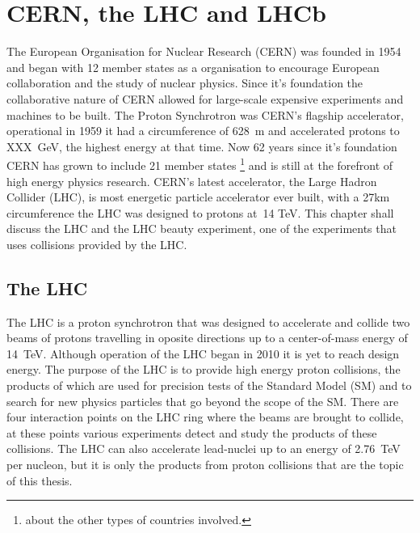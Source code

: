 \chapter{CERN, the LHC and LHCb}
\label{CERN_LHC_LHCb}

The European Organisation for Nuclear Research (CERN) was founded in 1954 and began with 12 member states as a organisation to encourage European collaboration and the study of nuclear physics. Since it's foundation the collaborative nature of CERN allowed for large-scale expensive experiments and machines to be built. The Proton Synchrotron was CERN's flagship accelerator, operational in 1959 it had a circumference of 628~m and accelerated protons to XXX~GeV, the highest energy at that time. Now 62 years since it's foundation CERN has grown to include 21 member states \footnote{about the other types of countries involved.} and is still at the forefront of high energy physics research. CERN’s latest accelerator, the Large Hadron Collider (LHC), is most energetic particle accelerator ever built, with a 27km circumference the LHC was designed to protons at~14 TeV. This chapter shall discuss the LHC and the LHC beauty experiment, one of the experiments that uses collisions provided by the LHC.

\section{The LHC}
\label{LHC}


The LHC is a proton synchrotron that was designed to accelerate and collide two beams of protons travelling in oposite directions up to a center-of-mass energy of 14~TeV. Although operation of the LHC began in 2010 it is yet to reach design energy. The purpose of the LHC is to provide high energy proton collisions, the products of which are used for precision tests of the Standard Model (SM) and to search for new physics particles that go beyond the scope of the SM. There are four interaction points on the LHC ring where the beams are brought to collide, at these points various experiments detect and study the products of these collisions. The LHC can also accelerate lead-nuclei up to an energy of 2.76~TeV per nucleon, but it is only the products from proton collisions that are the topic of this thesis.

